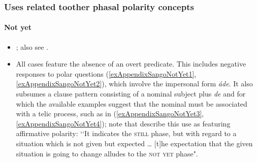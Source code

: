 \subsubsection{Uses related toother phasal polarity concepts}
\paragraph{Not yet}\label{appendixSangoNotYet}
\begin{itemize}
	\item \textcite{NassensteinPasch2021}; also see \textcite[104–105]{Lekens1955}.
	\item All cases feature the absence of an overt predicate. This includes negative responses to polar questions (\ref{exAppendixSangoNotYet1}, \ref{exAppendixSangoNotYet2}), which involve the impersonal form \textit{áde}. It also subsumes a clause pattern consisting of a nominal subject plus \textit{de} and for which the available examples suggest that the nominal must be associated with a telic process, such as in (\ref{exAppendixSangoNotYet3}, \ref{exAppendixSangoNotYet4}); note that \textcite[115]{NassensteinPasch2021} describe this use as featuring affirmative polarity: {\lq\lq}It indicates the \textsc{still} phase, but with regard to a situation which is not given but expected … [t]he expectation that the given situation is going to change alludes to the \textsc{not yet} phase".
\end{itemize}

